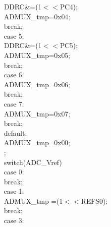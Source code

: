 \documentclass[titlepage, a4paper, 10pt, reqno, openany]{report}
\begin{document}
\begin{minipage}[t]{.3\linewidth}
\hspace*{1.5cm}			DDRC\&=\texttildelow (1$<<$PC4); \\
\hspace*{.5cm}			ADMUX\_tmp=0x04; \\
\hspace*{1.5cm}			break; \\
\hspace*{1cm}		case 5: \\
\hspace*{1.5cm}			DDRC\&=\texttildelow (1$<<$PC5); \\
\hspace*{1.5cm}			ADMUX\_tmp=0x05; \\
\hspace*{1.5cm}			break; \\
\hspace*{1cm}		case 6: \\
\hspace*{1.5cm}			ADMUX\_tmp=0x06; \\
\hspace*{1.5cm}			break; \\
\hspace*{1cm}		case 7: \\
\hspace*{1.5cm}			ADMUX\_tmp=0x07; \\
\hspace*{1.5cm}			break; \\
\hspace*{1cm}		default: \\
\hspace*{1.5cm}			ADMUX\_tmp=0x00; \\
\hspace*{.5cm}	\textbraceright ; \\
\hspace*{.5cm}	switch(ADC\_Vref)\textbraceleft \\
\hspace*{1cm}		case 0: \\
\hspace*{1.5cm}			break; \\
\hspace*{1cm}		case 1: \\
\hspace*{1.5cm}			ADMUX\_tmp \textbar =(1$<<$REFS0); \\
\hspace*{1.5cm}			break; \\
\hspace*{1cm}		case 3: \\

\end{minipage}
\end{document}
